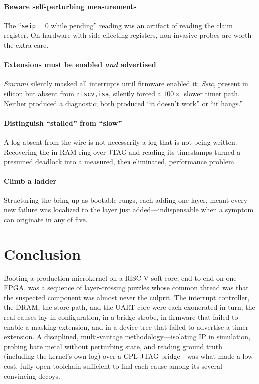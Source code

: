 \documentclass[conference,nofonttune]{IEEEtran}
\newcommand{\code}[1]{\texttt{#1}}
\newcommand{\reg}[1]{\texttt{#1}}
\begin{document}
\paragraph{Beware self-perturbing measurements}
The ``\reg{seip}${=}0$ while pending'' reading was an artifact of reading the
claim register. On hardware with side-effecting registers, non-invasive probes
are worth the extra care.

\paragraph{Extensions must be enabled \emph{and} advertised}
\emph{Smrnmi} silently masked all interrupts until firmware enabled it;
\emph{Sstc}, present in silicon but absent from \code{riscv,isa}, silently forced
a $100{\times}$ slower timer path. Neither produced a diagnostic; both produced
``it doesn't work'' or ``it hangs.''

\paragraph{Distinguish ``stalled'' from ``slow''}
A log absent from the wire is not necessarily a log that is not being written.
Recovering the in-RAM ring over JTAG and reading its timestamps turned a presumed
deadlock into a measured, then eliminated, performance problem.

\paragraph{Climb a ladder}
Structuring the bring-up as bootable rungs, each adding one layer, meant every new
failure was localized to the layer just added---indispensable when a symptom can
originate in any of five.

\section{Conclusion}

Booting a production microkernel on a RISC-V soft core, end to end on one FPGA,
was a sequence of layer-crossing puzzles whose common thread was that the
suspected component was almost never the culprit. The interrupt controller, the
DRAM, the store path, and the UART core were each exonerated in turn; the real
causes lay in configuration, in a bridge strobe, in firmware that failed to
enable a masking extension, and in a device tree that failed to advertise a timer
extension. A disciplined, multi-vantage methodology---isolating IP in simulation,
probing bare metal without perturbing state, and reading ground truth (including
the kernel's own log) over a GPL JTAG bridge---was what made a low-cost,
fully open toolchain sufficient to find each cause among its several convincing
decoys.
\end{document}
